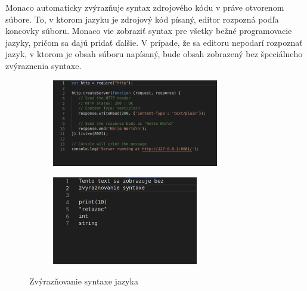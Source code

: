 Monaco automaticky zvýrazňuje syntax zdrojového kódu v práve otvorenom súbore. To, v ktorom jazyku
je zdrojový kód písaný, editor rozpozná podľa koncovky súboru. Monaco vie zobraziť syntax pre všetky
bežné programovacie jazyky, pričom sa dajú pridať ďalšie. V prípade, že sa editoru nepodarí
rozpoznať jazyk, v ktorom je obsah súboru napísaný, bude obsah zobrazený bez špeciálneho zvýraznenia
syntaxe.
\begin{figure}[H]
\centering
\begin{subfigure}{.5\textwidth}
  \centering
  \includegraphics[width=0.8\textwidth]{images/jazyk_js}
  \label{obr:jazyk_js}
\end{subfigure}%
\begin{subfigure}{.5\textwidth}
  \centering
  \includegraphics[width=0.7\textwidth]{images/jazyk_ziaden}
  \label{obr:jazyk_ziaden}
\end{subfigure}
\caption{Zvýrazňovanie syntaxe jazyka}
\end{figure}

